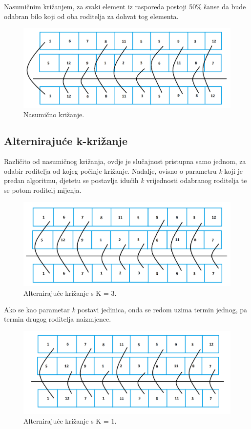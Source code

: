 \documentclass[times, utf8, zavrsni]{fer}
\begin{document}
Nasumičnim križanjem, za svaki element iz rasporeda postoji 50\% šanse da bude odabran bilo koji od oba roditelja za dohvat tog elementa.

\begin{figure}[htb]
\centering
\includegraphics[width=14cm]{images/rand_cross.png}
\caption{Nasumično križanje.}
\label{fig:rand_cross}
\end{figure}

\subsection{Alternirajuće k-križanje}

Različito od nasumičnog križanja, ovdje je slučajnost pristupna samo jednom, za odabir roditelja od kojeg počinje križanje. Nadalje, ovisno o parametru \emph{k} koji je predan algoritmu, djetetu se postavlja idućih \emph{k} vrijednosti odabranog roditelja te se potom roditelj mijenja.

\begin{figure}[htb]
\centering
\includegraphics[width=14cm]{images/cross_alt.png}
\caption{Alternirajuće križanje s K = 3.}
\label{fig:cross_alt}
\end{figure}

Ako se kao parametar \emph{k} postavi jedinica, onda se redom uzima termin jednog, pa termin drugog roditelja naizmjence.

\begin{figure}[htb]
\centering
\includegraphics[width=14cm]{images/cross_alt_1.png}
\caption{Alternirajuće križanje s K = 1.}
\label{fig:cross_alt_1}
\end{figure}
\end{document}
